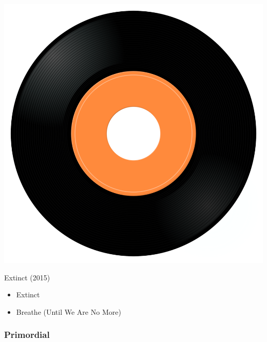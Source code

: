 \begin{minipage}[t]{0.25\textwidth}\vspace{0pt}
\captionsetup{type=figure}
\includegraphics[width=\textwidth]{Images/cover.png}
\caption*{Extinct (2015)}
\end{minipage}
\begin{minipage}[t]{0.25\textwidth}\vspace{0pt}
\begin{itemize}[nosep,leftmargin=1em,labelwidth=*,align=left]
	\setlength{\itemsep}{0pt}
	\item Extinct
	\item Breathe (Until We Are No More)
\end{itemize}
\end{minipage}

\subsubsection{Primordial}

